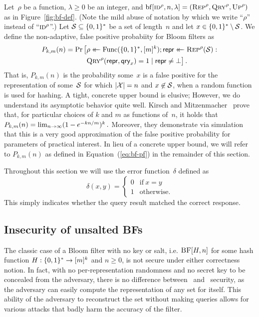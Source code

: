 Let~$\rho$ be a function, $\lambda\geq0$ be an integer, and
$\mathrm{bf}[\textnormal{\textsc{id}}^\rho,n,\lambda] = (\textnormal{\textsc{Rep}}^\rho, \textnormal{\textsc{Qry}}^\rho, \textnormal{\textsc{Up}}^\rho)$ as in
Figure~\ref{fig:bf-def}. (Note the mild abuse of notation by which we write
``$\rho$'' instead of ``$\textnormal{\textsc{id}}^\rho$''.)
%
Let $\mathcal{S}\subseteq\{0,1\}^*$ be a set of length~$n$ and let
$x\in\{0,1\}^*\setminus\mathcal{S}$. We define the non-adaptive, false positive
probabiity for Bloom filters as
\begin{equation}\label{eq:bf-fp}
  \begin{aligned}
    P_{k,m}(n) =
      \Pr\big[&\rho \mathrel{\leftarrow\mkern-14mu\leftarrow} \mathrm{Func}(\{0,1\}^*,[m]^k);
              \mathsf{repr} \mathrel{\leftarrow\mkern-14mu\leftarrow} \textnormal{\textsc{Rep}}^\rho(\mathcal{S}): \\
              &\textnormal{\textsc{Qry}}^\rho(\mathsf{repr}, \mathsf{qry}_x) = 1 \mid \mathsf{repr} \ne \bot
      \big] \,.
  \end{aligned}
\end{equation}
%
%
That is, $P_{k,m}(n)$ is the probability some~$x$ is a false positive for the
representation of some~$\mathcal{S}$ for which $|\mathcal{X}|=n$ and $x\not\in\mathcal{S}$, when a
random function is used for hashing.
%
A tight, concrete upper bound is elusive;  However, we do understand its asymptotic behavior
quite well. Kirsch and Mitzenmacher~\cite{kirsch2006less} prove that, for
particular choices of $k$ and $m$ as functions of~$n$, it holds that
$
  P_{k,m}(n) = \lim_{n{\rightarrow}\infty} (1-e^{-kn/m})^k \,.
$
%
Moreover, they demonstrate via simulation that this is a very good approximation
of the false positive probability for parameters of practical interest.
%
In lieu of a concrete upper bound, we will refer to $P_{k,m}(n)$ as defined in
Equation~(\ref{eq:bf-pf}) in the remainder of this section.

%
Throughout this section we will use the error function~$\delta$ defined as
\begin{equation}
  \delta(x, y) =
  \begin{cases}
    0 & \text{if}\ x=y \\
    1 & \text{otherwise.}
  \end{cases}
\end{equation}
This simply indicates whether the query result matched the correct response.

\subsection{Insecurity of unsalted BFs}
The classic case of a Bloom filter with no key or salt, i.e. $\textnormal{\textsc{BF}}[H,n]$ for some
hash function $H: \{0,1\}^* \to [m]^k$ and $n \ge 0$, is not secure under either
correctness notion. In fact, with no per-representation randomness and no secret
key to be concealed from the adversary, there is no difference between \errep\
and \erreps\ security, as the adversary can easily compute the representation of
any set for itself. This ability of the adversary to reconstruct the set without
making queries allows for various attacks that badly harm the accuracy of the
filter.

